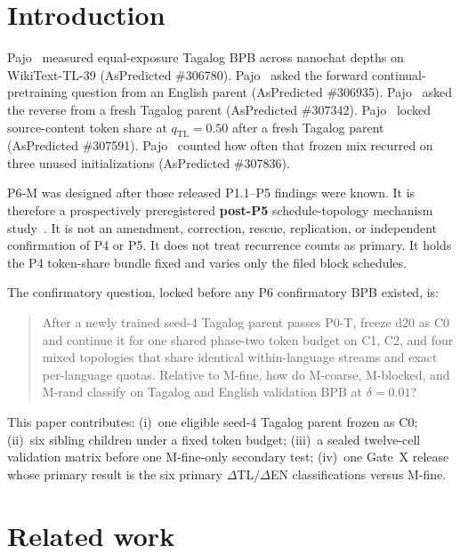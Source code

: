 \documentclass[11pt,a4paper]{article}
\begin{document}
\section{Introduction}
\label{sec:intro}

Pajo~\cite{pajo2026p11} measured equal-exposure Tagalog BPB across nanochat depths on WikiText-TL-39 (AsPredicted \#306780). Pajo~\cite{pajo2026p2} asked the forward continual-pretraining question from an English parent (AsPredicted \#306935). Pajo~\cite{pajo2026p3} asked the reverse from a fresh Tagalog parent (AsPredicted \#307342). Pajo~\cite{pajo2026p4} locked source-content token share at $q_{\mathrm{TL}}=0.50$ after a fresh Tagalog parent (AsPredicted \#307591). Pajo~\cite{pajo2026p5} counted how often that frozen mix recurred on three unused initializations (AsPredicted \#307836).

P6-M was designed after those released P1.1--P5 findings were known. It is therefore a prospectively preregistered \textbf{post-P5} schedule-topology mechanism study~\cite{aspredicted307969}. It is not an amendment, correction, rescue, replication, or independent confirmation of P4 or P5. It does not treat recurrence counts as primary. It holds the P4 token-share bundle fixed and varies only the filed block schedules.

The confirmatory question, locked before any P6 confirmatory BPB existed, is:

\begin{quote}
After a newly trained seed-4 Tagalog parent passes P0-T, freeze d20 as C0 and continue it for one shared phase-two token budget on C1, C2, and four mixed topologies that share identical within-language streams and exact per-language quotas. Relative to M-fine, how do M-coarse, M-blocked, and M-rand classify on Tagalog and English validation BPB at $\delta=0.01$?
\end{quote}

This paper contributes: (i)~one eligible seed-4 Tagalog parent frozen as C0; (ii)~six sibling children under a fixed token budget; (iii)~a sealed twelve-cell validation matrix before one M-fine-only secondary test; (iv)~one Gate~X release whose primary result is the six primary $\Delta$TL/$\Delta$EN classifications versus M-fine.

\section{Related work}
\label{sec:related}
\end{document}
